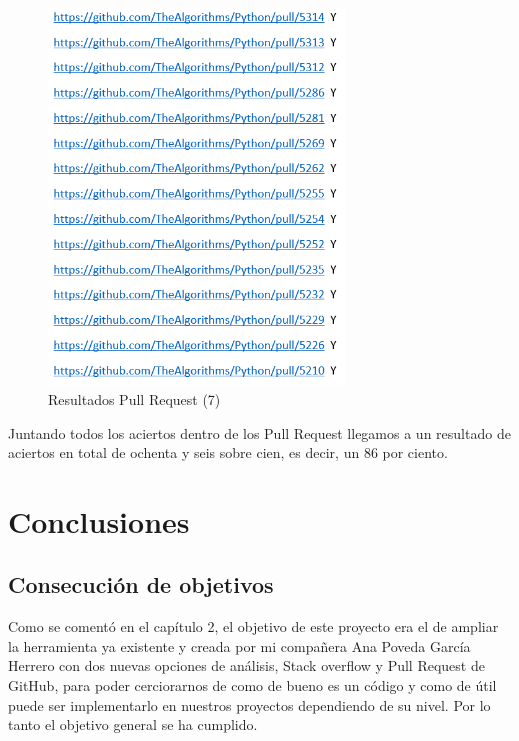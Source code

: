 \documentclass[a4paper, 12pt]{book}
\begin{document}
\begin{figure}
	\centering
    \includegraphics[width=0.7\textwidth]{img/git11}
    \caption{Resultados Pull Request (7)}
    \label{figura:git11}
 \end{figure}
 
Juntando todos los aciertos dentro de los Pull Request llegamos a un resultado de aciertos en total de ochenta y seis sobre cien, es decir, un 86 por ciento.



\cleardoublepage
\chapter{Conclusiones}
\label{chap:conclusiones}


\section{Consecución de objetivos}
\label{sec:consecucion-objetivos}

Como se comentó en el capítulo 2, el objetivo de este proyecto era el de ampliar la herramienta ya existente y creada por mi compañera Ana Poveda García Herrero con dos nuevas opciones de análisis, Stack overflow y Pull Request de GitHub, para poder cerciorarnos de como de bueno es un código y como de útil puede ser implementarlo en nuestros proyectos dependiendo de su nivel. Por lo tanto el objetivo general se ha cumplido.
\end{document}

